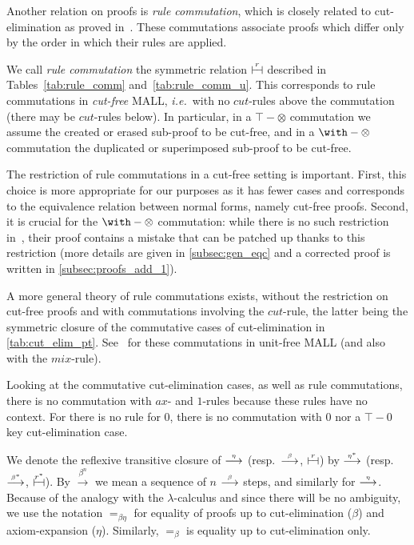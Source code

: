 \documentclass{lmcs}
\newcommand*{\tens}{\otimes} %
\newcommand*{\ie}{\emph{i.e.}}
\newcommand*{\resp}{resp.}
\newcommand*{\eqeq}{=} %
\newcommand{\symboltext}[2]{\mathrel{\overset{\makebox[0pt]{\mbox{\normalfont\tiny\sffamily \ensuremath{#1}}}}{#2}}} %
\newcommand{\etato}{\symboltext{\eta}{\longrightarrow}}
\newcommand{\etatostar}{\symboltext{\eta^*}{\longrightarrow}}
\newcommand{\betato}{\symboltext{\beta}{\longrightarrow}}
\newcommand{\betatostar}{\symboltext{\beta^*}{\longrightarrow}}
\newcommand{\vdashv}{\mathrel{\lower .22ex \hbox{$\vdash\!\dashv$}}}
\DeclareRobustCommand{\astsymbol}[1]{\mathrel{\ooalign{{$\vdashv$}\crcr{$\stackrel{#1}{\hphantom{\vdashv}\vphantom{\to}}$}}}}
\newcommand{\eqcone}{\astsymbol{r}} %
\newcommand{\eqc}{\astsymbol{r^\ast}} %
\newcommand{\eqb}{\mathrel{\eqeq_{\beta}}}
\newcommand{\eqbn}{\mathrel{\eqeq_{\beta\eta}}}
\begin{document}
Another relation on proofs is \emph{rule commutation}, which is closely related to cut-elimination as proved in~\cite{calculusformall}.
These commutations associate proofs which differ only by the order in which their rules are applied.

\begin{defi}
\label{def:rule_comm}
We call \emph{rule commutation} the symmetric relation $\eqcone$ described in Tables~\ref{tab:rule_comm} and~\ref{tab:rule_comm_u}.
This corresponds to rule commutations in \emph{cut-free} MALL, \ie\ with no $cut$-rules above the commutation (there may be $cut$-rules below).
In particular, in a $\top-\tens$ commutation we assume the created or erased sub-proof to be cut-free, and in a $\with-\tens$ commutation the duplicated or superimposed sub-proof to be cut-free.
\end{defi}

The restriction of rule commutations in a cut-free setting is important.
First, this choice is more appropriate for our purposes as it has fewer cases and corresponds to the equivalence relation between normal forms, namely cut-free proofs.
Second, it is crucial for the $\with-\tens$ commutation: while there is no such restriction in~\cite{calculusformall}, their proof contains a mistake that can be patched up thanks to this restriction (more details are given in \autoref{subsec:gen_eqc} and a corrected proof is written in \autoref{subsec:proofs_add_1}).

\begin{rem}
\label{rem:rule_comm_cut}
A more general theory of rule commutations exists, without the restriction on cut-free proofs and with commutations involving the $cut$-rule, the latter being the symmetric closure of the commutative cases of cut-elimination in \autoref{tab:cut_elim_pt}.
See~\cite{mallpncom} for these commutations in unit-free MALL (and also with the $mix$-rule).
\end{rem}

\begin{rem}
\label{rem:comm_lacking}
Looking at the commutative cut-elimination cases, as well as rule commutations, there is no commutation with $ax$- and $1$-rules because these rules have no context.
For there is no rule for $0$, there is no commutation with $0$ nor a $\top-0$ key cut-elimination case.
\end{rem}

We denote the reflexive transitive closure of $\etato$ (\resp\ $\betato$, $\eqcone$) by $\etatostar$ (\resp\ $\betatostar$, $\eqc$).
By $\overset{\beta^n}{\longrightarrow}$ we mean a sequence of $n$ $\betato$ steps, and similarly for $\etato$.
Because of the analogy with the $\lambda$-calculus and since there will be no ambiguity, we use the notation $\eqbn$ for equality of proofs up to cut-elimination ($\beta$) and axiom-expansion ($\eta$).
Similarly, $\eqb$ is equality up to cut-elimination only.
\end{document}
